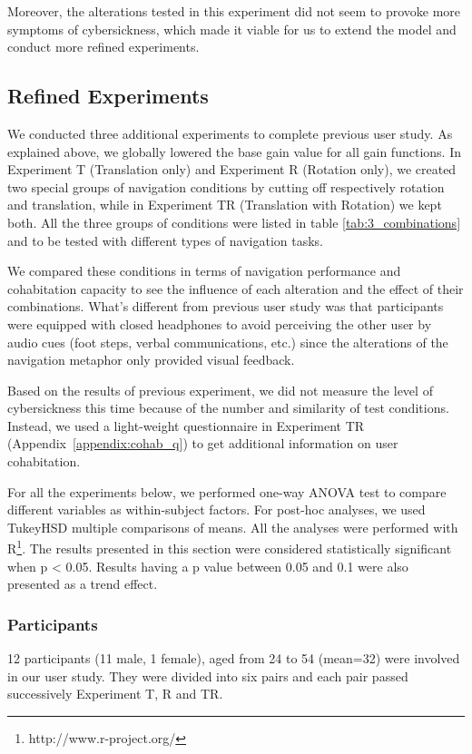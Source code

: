 Moreover, the alterations tested in this experiment did not seem to provoke more symptoms of cybersickness, which made it viable for us to extend the model and conduct more refined experiments.

\subsection{Refined Experiments}
We conducted three additional experiments to complete previous user study. As explained above, we globally lowered the base gain value for all gain functions. In Experiment T (Translation only) and Experiment R (Rotation only), we created two special groups of navigation conditions by cutting off respectively rotation and translation, while in Experiment TR (Translation with Rotation) we kept both. All the three groups of conditions were listed in table \ref{tab:3_combinations} and to be tested with different types of navigation tasks. 

We compared these conditions in terms of navigation performance and cohabitation capacity to see the influence of each alteration and the effect of their combinations. What's different from previous user study was that participants were equipped with closed headphones to avoid perceiving the other user by audio cues (foot steps, verbal communications, etc.) since the alterations of the navigation metaphor only provided visual feedback.

Based on the results of previous experiment, we did not measure the level of cybersickness this time because of the number and similarity of test conditions. Instead, we used a light-weight questionnaire in Experiment TR (Appendix~\ref{appendix:cohab_q}) to get additional information on user cohabitation.

For all the experiments below, we performed one-way ANOVA test to compare different variables as within-subject factors. For post-hoc analyses, we used TukeyHSD multiple comparisons of means. All the analyses were performed with R\footnote{http://www.r-project.org/}. The results presented in this section were considered statistically significant when p \textless{} 0.05. Results having a p value between 0.05 and 0.1 were also presented as a trend effect.

\subsubsection{Participants}
12 participants (11 male, 1 female), aged from 24 to 54 (mean=32) were involved in our user study. They were divided into six pairs and each pair passed successively Experiment T, R and TR.

